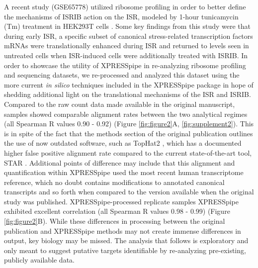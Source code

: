 \documentclass[11pt, a4paper, oneside]{article}
\begin{document}
A recent study (GSE65778) utilized ribosome profiling in order to better define the mechanisms of ISRIB action on the ISR, modeled by 1-hour tunicamycin (Tm) treatment in HEK293T cells \cite{isrib_riboseq}. Some key findings from this study were that during early ISR, a specific subset of canonical stress-related transcription factors mRNAs were translationally enhanced during ISR and returned to levels seen in untreated cells when ISR-induced cells were additionally treated with ISRIB. In order to showcase the utility of XPRESSpipe in re-analyzing ribosome profiling and sequencing datasets, we re-processed and analyzed this dataset using the more current \textit{in silico} techniques included in the XPRESSpipe package in hope of shedding additional light on the translational mechanisms of the ISR and ISRIB. Compared to the raw count data made available in the original manuscript, samples showed comparable alignment rates between the two analytical regimes (all Spearman R values 0.90 - 0.92) (Figure \ref{fig:figure2}A, \ref{fig:supplement2}). This is in spite of the fact that the methods section of the original publication outlines the use of now outdated software, such as TopHat2 \cite{tophat2}, which has a documented higher false positive alignment rate compared to the current state-of-the-art tool, STAR \cite{alignment_benchmark, star}. Additional points of difference may include that this alignment and quantification within XPRESSpipe used the most recent human transcriptome reference, which no doubt contains modifications to annotated canonical transcripts and so forth when compared to the version available when the original study was published. XPRESSpipe-processed replicate samples XPRESSpipe exhibited excellent correlation (all Spearman R values 0.98 - 0.99) (Figure \ref{fig:figure2}B). While these differences in processing between the original publication and XPRESSpipe methods may not create immense differences in output, key biology may be missed. The analysis that follows is exploratory and only meant to suggest putative targets identifiable by re-analyzing pre-existing, publicly available data. \par
\end{document}
